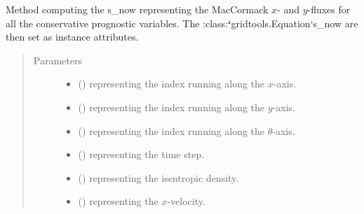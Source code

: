\documentclass[letterpaper,10pt,english]{sphinxmanual}
\begin{document}
\begin{fulllineitems}
\begin{fulllineitems}
\end{fulllineitems}


\begin{fulllineitems}
\label{\detokenize{api:dycore.flux_isentropic_maccormack.FluxIsentropicMacCormack._compute_horizontal_fluxes}}
Method computing the s\_now representing the MacCormack \(x\)- and \(y\)-fluxes for all
the conservative prognostic variables. The :class:{\color{red}\bfseries{}{}`}gridtools.Equation{}`s\_now are then set as instance attributes.
\begin{quote}\begin{description}
\item[{Parameters}] \leavevmode\begin{itemize}
\item {} 
 () \textendash{}  representing the index running along the \(x\)-axis.

\item {} 
 () \textendash{}  representing the index running along the \(y\)-axis.

\item {} 
 () \textendash{}  representing the index running along the \(\theta\)-axis.

\item {} 
 () \textendash{}  representing the time step.

\item {} 
 () \textendash{}  representing the isentropic density.

\item {} 
 () \textendash{}  representing the \(x\)-velocity.


\end{itemize}
\end{description}
\end{quote}
\end{fulllineitems}
\end{fulllineitems}
\end{document}

